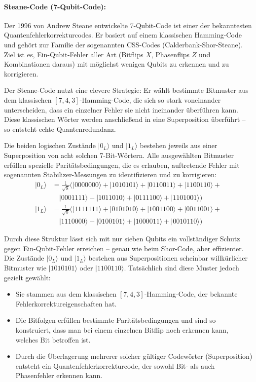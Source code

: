 \paragraph{Steane-Code (7-Qubit-Code):}

Der 1996 von Andrew Steane entwickelte 7-Qubit-Code ist einer der bekanntesten Quantenfehlerkorrekturcodes. Er basiert auf einem klassischen Hamming-Code und gehört zur Familie der sogenannten CSS-Codes (Calderbank-Shor-Steane). Ziel ist es, Ein-Qubit-Fehler aller Art (Bitflips \(X\), Phasenflips \(Z\) und Kombinationen daraus) mit möglichst wenigen Qubits zu erkennen und zu korrigieren.

Der Steane-Code nutzt eine clevere Strategie: Er wählt bestimmte Bitmuster aus dem klassischen \([7,4,3]\)-Hamming-Code, die sich so stark voneinander unterscheiden, dass ein einzelner Fehler sie nicht ineinander überführen kann. Diese klassischen Wörter werden anschließend in eine Superposition überführt – so entsteht echte Quantenredundanz.

Die beiden logischen Zustände \(|0_L\rangle\) und \(|1_L\rangle\) bestehen jeweils aus einer Superposition von acht solchen 7-Bit-Wörtern. Alle ausgewählten Bitmuster erfüllen spezielle Paritätsbedingungen, die es erlauben, auftretende Fehler mit sogenannten Stabilizer-Messungen zu identifizieren und zu korrigieren:
\[
\begin{aligned}
|0_L\rangle &= \frac{1}{\sqrt{8}} \big( 
|0000000\rangle + |1010101\rangle + |0110011\rangle + |1100110\rangle + {} \\
&\quad |0001111\rangle + |1011010\rangle + |0111100\rangle + |1101001\rangle \big) \\
|1_L\rangle &= \frac{1}{\sqrt{8}} \big( 
|1111111\rangle + |0101010\rangle + |1001100\rangle + |0011001\rangle + {} \\
&\quad |1110000\rangle + |0100101\rangle + |1000011\rangle + |0010110\rangle \big)
\end{aligned}
\]

Durch diese Struktur lässt sich mit nur sieben Qubits ein vollständiger Schutz gegen Ein-Qubit-Fehler erreichen – genau wie beim Shor-Code, aber effizienter.\\

Die Zustände \(|0_L\rangle\) und \(|1_L\rangle\) bestehen aus Superpositionen scheinbar willkürlicher Bitmuster wie \(|1010101\rangle\) oder \(|1100110\rangle\). Tatsächlich sind diese Muster jedoch gezielt gewählt:

\begin{itemize}
  \item Sie stammen aus dem klassischen \([7,4,3]\)-Hamming-Code, der bekannte Fehlerkorrektureigenschaften hat.
  \item Die Bitfolgen erfüllen bestimmte Paritätsbedingungen und sind so konstruiert, dass man bei einem einzelnen Bitflip noch erkennen kann, welches Bit betroffen ist.
  \item Durch die Überlagerung mehrerer solcher gültiger Codewörter (Superposition) entsteht ein Quantenfehlerkorrekturcode, der sowohl Bit- als auch Phasenfehler erkennen kann.
\end{itemize}

